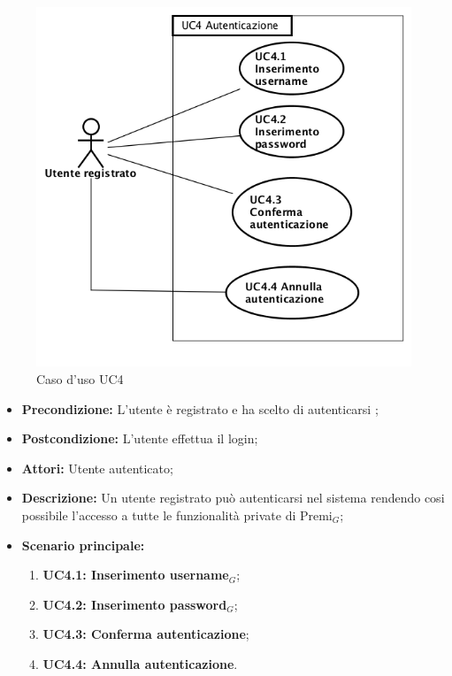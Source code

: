 \begin{figure}[h]
	\begin{center}
	\includegraphics[scale=0.4]{diagram/UC4.png}
	\caption{Caso d'uso UC4}
	\end{center}
\end{figure}
\begin{itemize}
	\item \textbf{Precondizione:} L'utente è registrato e ha scelto di autenticarsi ;
	\item \textbf{Postcondizione:} L'utente effettua il login;
	\item \textbf{Attori:} Utente autenticato;
	\item \textbf{Descrizione:} Un utente registrato può autenticarsi nel sistema rendendo cosi possibile l'accesso a tutte le funzionalità private di Premi$_G$;
	\item \textbf{Scenario principale:}
	\begin{enumerate}
		\item \textbf{ UC4.1: Inserimento username$_G$};
		\item \textbf{ UC4.2: Inserimento password$_G$};
		\item \textbf{ UC4.3: Conferma autenticazione};
		\item \textbf{ UC4.4: Annulla autenticazione}.
	\end{enumerate}
\end{itemize}
